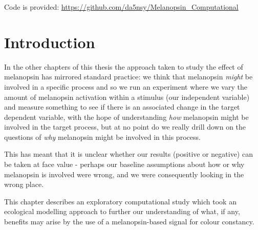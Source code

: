 

Code is provided: \url{https://github.com/da5nsy/Melanopsin_Computational}

\section{Introduction}

In the other chapters of this thesis the approach taken to study the effect of melanopsin has mirrored standard practice: we think that melanopsin \emph{might} be involved in a specific process and so we run an experiment where we vary the amount of melanopsin activation within a stimulus (our independent variable) and measure something to see if there is an associated change in the target dependent variable, with the hope of understanding \emph{how} melanopsin might be involved in the target process, but at no point do we really drill down on the questions of \emph{why} melanopsin might be involved in this process.

This has meant that it is unclear whether our results (positive or negative) can be taken at face value - perhaps our baseline assumptions about how or why melanopsin is involved were wrong, and we were consequently looking in the wrong place.

This chapter describes an exploratory computational study which took an ecological modelling approach to further our understanding of what, if any, benefits may arise by the use of a melanopsin-based signal for colour constancy.


